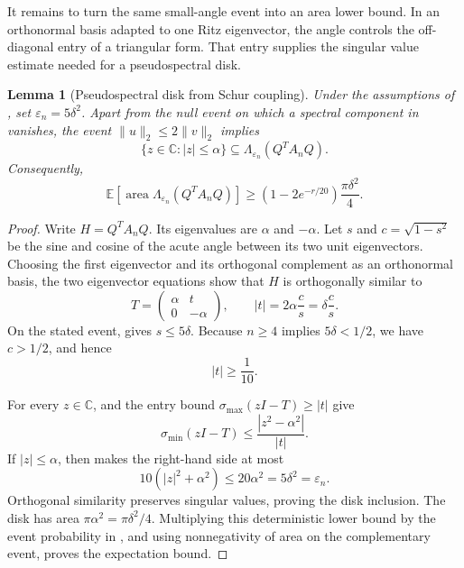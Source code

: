 \documentclass[11pt]{article}
\newtheorem{lemma}{Lemma}[section]
\begin{document}
It remains to turn the same small-angle event into an area lower bound.  In an
orthonormal basis adapted to one Ritz eigenvector, the angle controls the
off-diagonal entry of a triangular form.  That entry supplies the singular
value estimate needed for a pseudospectral disk.

\begin{lemma}[Pseudospectral disk from Schur coupling]
\label{lem:pseudospectral-disk}
Under the assumptions of , set
$\varepsilon_n=5\delta^2$.  Apart from the null event on which a spectral
component in  vanishes, the event
$\lVert u\rVert_2\leq2\lVert v\rVert_2$ implies
\[
  \{z\in\mathbb C:|z|\leq\alpha\}
  \subseteq\Lambda_{\varepsilon_n}(Q^TA_nQ).
\]
Consequently,
\[
  \mathbb E\!\left[\operatorname{area}
  \Lambda_{\varepsilon_n}(Q^TA_nQ)\right]
  \geq(1-2e^{-r/20})\frac{\pi\delta^2}{4}.
\]
\end{lemma}

\begin{proof}
Write $H=Q^TA_nQ$.  Its eigenvalues are $\alpha$ and $-\alpha$.  Let $s$ and
$c=\sqrt{1-s^2}$ be the sine and cosine of the acute angle between its two unit
eigenvectors.  Choosing the first eigenvector and its orthogonal complement as
an orthonormal basis, the two eigenvector equations show that $H$ is
orthogonally similar to
\begin{equation}
  T=\begin{pmatrix}\alpha&t\\0&-\alpha\end{pmatrix},
  \qquad
  |t|=2\alpha\frac{c}{s}=\delta\frac{c}{s}.
  \label{eq:schur-form}
\end{equation}
On the stated event,  gives $s\leq5\delta$.  Because
$n\geq4$ implies $5\delta<1/2$, we have $c>1/2$, and hence
\begin{equation}
  |t|\geq\frac1{10}.
  \label{eq:schur-coupling}
\end{equation}

For every $z\in\mathbb C$,  and the entry
bound $\sigma_{\max}(zI-T)\geq|t|$ give
\[
  \sigma_{\min}(zI-T)
  \leq\frac{|z^2-\alpha^2|}{|t|}.
\]
If $|z|\leq\alpha$, then  makes the right-hand side at
most
\[
  10(|z|^2+\alpha^2)
  \leq20\alpha^2
  =5\delta^2
  =\varepsilon_n.
\]
Orthogonal similarity preserves singular values, proving the disk inclusion.
The disk has area $\pi\alpha^2=\pi\delta^2/4$.  Multiplying this deterministic
lower bound by the event probability in , and using
nonnegativity of area on the complementary event, proves the expectation
bound.
\end{proof}
\end{document}
